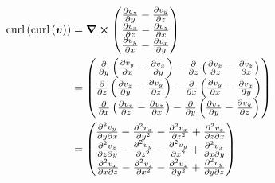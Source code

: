 \documentclass{article}
\renewcommand{\vec}[1]{\boldsymbol{#1}}
\begin{document}
\begin{align*}
    \text{curl}\left(\text{curl}\left(\vec{v}\right)\right) &= \curl \begin{pmatrix} \frac{\partial{ v_z }}{\partial{ y }} - \frac{\partial{ v_y }}{\partial{ z }} \\ \frac{\partial{ v_x }}{\partial{ z }} - \frac{\partial{ v_z }}{\partial{ x }} \\ \frac{\partial{ v_y }}{\partial{ x }} - \frac{\partial{ v_x }}{\partial{ y }} \end{pmatrix} \\
    &= \begin{pmatrix} \frac{\partial{  }}{\partial{ y }} \left( \frac{\partial{ v_y }}{\partial{ x }} - \frac{\partial{ v_x }}{\partial{ y }} \right) - \frac{\partial{  }}{\partial{ z }} \left( \frac{\partial{ v_x }}{\partial{ z }} - \frac{\partial{ v_z }}{\partial{ x }} \right) \\ \frac{\partial{  }}{\partial{ z }} \left( \frac{\partial{ v_z }}{\partial{ y }} - \frac{\partial{ v_y }}{\partial{ z }} \right) - \frac{\partial{  }}{\partial{ x }} \left( \frac{\partial{ v_y }}{\partial{ x }} - \frac{\partial{ v_x }}{\partial{ y }} \right) \\ \frac{\partial{  }}{\partial{ x }} \left( \frac{\partial{ v_x }}{\partial{ z }} - \frac{\partial{ v_z }}{\partial{ x }} \right) - \frac{\partial{  }}{\partial{ y }} \left( \frac{\partial{ v_z }}{\partial{ y }} - \frac{\partial{ v_y }}{\partial{ z }} \right) \end{pmatrix} \\
    &= \begin{pmatrix} \frac{\partial^{2} { v_y }}{\partial{ y \partial{ x } }} - \frac{\partial^{2} { v_x }}{\partial{ y^{2} }} - \frac{\partial^{2} { v_x }}{\partial{ z^{2} }} + \frac{\partial^{2} { v_z }}{\partial{ z \partial{ x } }} \\ \frac{\partial^{2} { v_z }}{\partial{ z \partial{ y } }} - \frac{\partial^{2} { v_y }}{\partial{ z^{2} }} - \frac{\partial^{2} { v_y }}{\partial{ x^{2} }} + \frac{\partial^{2} { v_x }}{\partial{ x \partial{ y } }} \\ \frac{\partial^{2} { v_x }}{\partial{ x \partial{ z } }} - \frac{\partial^{2} { v_z }}{\partial{ x^{2} }} - \frac{\partial^{2} { v_z }}{\partial{ y^{2} }} + \frac{\partial^{2} { v_y }}{\partial{ y \partial{ z } }} \end{pmatrix} \\

\end{align*}
\end{document}
